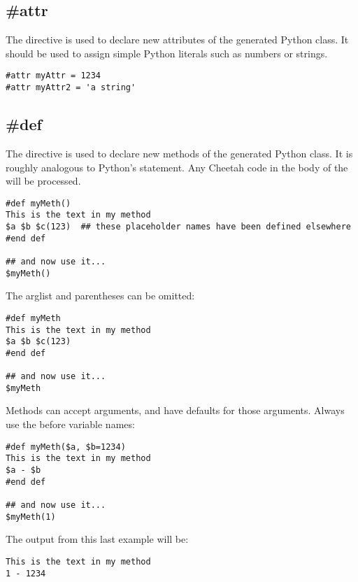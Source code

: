 \subsection{\#attr}
\label{inheritanceEtc.attr}

The  directive is used to declare new attributes of the generated Python
class.  It should be used to assign simple Python literals such as numbers or
strings.  

\begin{verbatim}
#attr myAttr = 1234
#attr myAttr2 = 'a string'
\end{verbatim}


\subsection{\#def}
\label{inheritanceEtc.def}

The  directive is used to declare new methods of the generated Python
class.  It is roughly analogous to Python's  statement.  Any Cheetah
code in the body of the  will be processed.  

\begin{verbatim}
#def myMeth()
This is the text in my method 
$a $b $c(123)  ## these placeholder names have been defined elsewhere
#end def

## and now use it...
$myMeth()
\end{verbatim}

The arglist and parentheses can be omitted:
\begin{verbatim}
#def myMeth
This is the text in my method 
$a $b $c(123)
#end def

## and now use it...
$myMeth
\end{verbatim}

Methods can accept arguments, and have defaults for those arguments.  Always use the 
\code{\$} before variable names:
\begin{verbatim}
#def myMeth($a, $b=1234)
This is the text in my method 
$a - $b
#end def

## and now use it...
$myMeth(1)
\end{verbatim}

The output from this last example will be:

\begin{verbatim}
This is the text in my method 
1 - 1234
\end{verbatim}

